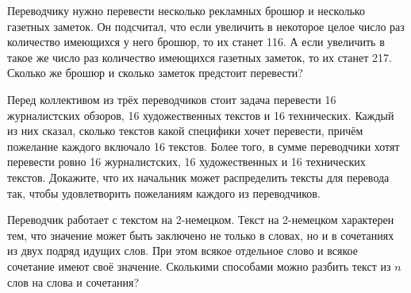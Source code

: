 ﻿
\begin{itemize}

\itA Переводчику нужно перевести несколько рекламных брошюр и несколько газетных заметок. Он подсчитал, что если увеличить в некоторое целое число раз количество имеющихся у него брошюр, то их станет 116. А если увеличить в такое же число раз количество имеющихся газетных заметок, то их станет 217. Сколько же брошюр и сколько заметок предстоит перевести?

\itB Перед коллективом из трёх переводчиков стоит задача перевести 16 журналистских обзоров, 16 художественных текстов и 16 технических. Каждый из них сказал, сколько текстов какой специфики хочет перевести, причём пожелание каждого включало 16 текстов. Более того, в сумме переводчики хотят перевести ровно 16 журналистских, 16 художественных и 16 технических текстов. Докажите, что их начальник может распределить тексты для перевода так, чтобы удовлетворить пожеланиям каждого из переводчиков.

\itC Переводчик работает с текстом на 2-немецком. Текст на 2-немецком характерен тем, что значение может быть заключено не только в словах, но и в сочетаниях из двух подряд идущих слов. При этом всякое отдельное слово и всякое сочетание имеют своё значение. Сколькими способами можно разбить текст из $n$ слов на слова и сочетания?
\end{itemize}